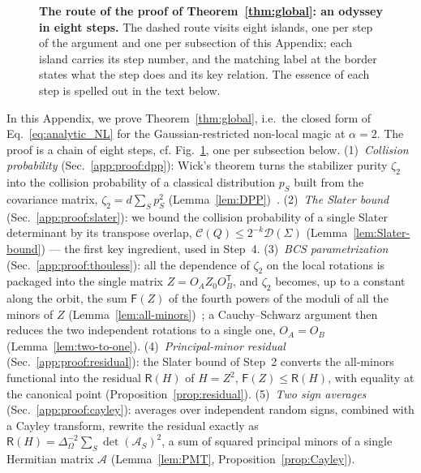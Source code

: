 \documentclass[prx,twocolumn,superscriptaddress,aps,10pt, frontmatterverbose, reprint,footinbib,longbibliography=true]{revtex4-2}
\newcommand{\trans}{\mathsf{T}}
\newcommand{\RENYI}{\alpha}
\begin{document}
\begin{figure}[ht!]
\caption{\textbf{The route of the proof of Theorem~\ref{thm:global}: an odyssey in eight steps.} The dashed route visits eight islands, one per step of the argument and one per subsection of this Appendix; each island carries its step number, and the matching label at the border states what the step does and its key relation. The essence of each step is spelled out in the text below.}
\label{fig:odyssey}
\end{figure}


In this Appendix, we prove Theorem~\ref{thm:global}, i.e.\ the closed form of Eq.~\eqref{eq:analytic_NL} for the Gaussian-restricted non-local magic at $\RENYI=2$. The proof is a chain of eight steps, cf. Fig.~\ref{fig:odyssey}, one per subsection below.
(1)~\emph{Collision probability} (Sec.~\ref{app:proof:dpp}):  Wick's theorem turns the stabilizer purity $\zeta_2$ into the collision probability of a classical distribution $p_S$  built from the covariance matrix, $\zeta_2=d\sum_Sp_S^2$ (Lemma~\ref{lem:DPP})~\cite{collura2026nonstabilizernessfermionicgaussianstates}.
(2)~\emph{The Slater bound}  (Sec.~\ref{app:proof:slater}): we bound the collision probability of a single Slater determinant by its transpose overlap, $\mathcal{C}(Q)\le2^{-k}\mathcal{D}(\Sigma)$ (Lemma~\ref{lem:Slater-bound}) --- the first key ingredient, used in Step~4.
(3)~\emph{BCS parametrization} (Sec.~\ref{app:proof:thouless}): all the dependence of $\zeta_2$ on the local rotations is packaged into the single matrix $Z=O_AZ_0O_B^{\trans}$, and $\zeta_2$ becomes, up to a constant along the orbit, the sum $\mathsf{F}(Z)$ of the fourth powers of the moduli of all the minors of $Z$ (Lemma~\ref{lem:all-minors})~\cite{Mbeng2024,surace}; a Cauchy--Schwarz argument then reduces the two independent rotations to a single one, $O_A=O_B$  (Lemma~\ref{lem:two-to-one}).
(4)~\emph{Principal-minor residual} (Sec.~\ref{app:proof:residual}): the Slater bound of Step~2  converts the all-minors functional into the residual  $\mathsf{R}(H)$ of $H=Z^2$, $\mathsf{F}(Z)\le\mathsf{R}(H)$, with equality at the canonical point (Proposition~\ref{prop:residual}).
(5)~\emph{Two sign averages} (Sec.~\ref{app:proof:cayley}): averages over independent random signs, combined with a Cayley transform, rewrite the residual exactly as $\mathsf{R}(H)=\Delta_\Omega^{-2}\sum_S\det(\mathcal{A}_S)^2$, a sum of squared principal minors of a single Hermitian matrix $\mathcal{A}$ (Lemma~\ref{lem:PMT}, Proposition~\ref{prop:Cayley}).
\end{document}
